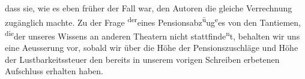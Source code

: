                dass sie, wie es eben früher der Fall war, den Autoren die gleiche Verrechnung zu{\pb}gänglich machte.\pend
           \pstart
           Zu der Frage \substVorne{}\textsuperscript{der}\substDazwischen{}eines\substHinten{} Pensionsabz\substVorne{}\textsuperscript{ü}\substDazwischen{}u\substHinten{}g\substVorne{}\textsuperscript{e}\substDazwischen{}es\substHinten{} von den Tantiemen, \substVorne{}\textsuperscript{die}\substDazwischen{}der\substHinten{} unseres Wissens an anderen Theatern  nicht stattfinde\substVorne{}\textsuperscript{n}\substDazwischen{}t\substHinten{}, behalten wir uns eine Aeusserung vor, sobald wir über die Höhe der
               Pensionszuschläge und Höhe der Lustbarkeitssteuer den bereits in unserem vorigen
               Schreiben erbetenen Aufschluss erhalten haben.\pend
           \endnumbering{}  
      